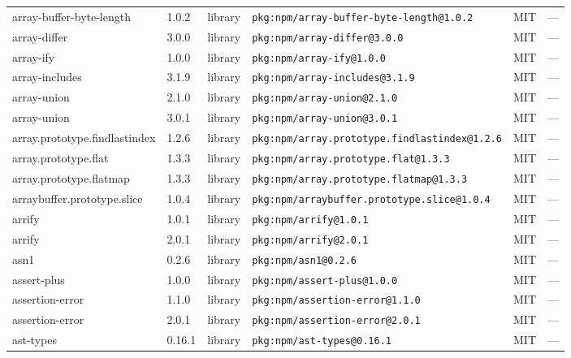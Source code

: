 \documentclass[11pt,a4paper]{article}
\begin{document}
\begin{longtable}{|p{4cm}|p{2cm}|p{1.6cm}|p{5cm}|p{1.5cm}|p{3.5cm}|}
\raggedright array-buffer-byte-length & 1.0.2 & library & \small\texttt{pkg:npm/array-buffer-byte-length@1.0.2} & MIT & \small — \\
\raggedright array-differ & 3.0.0 & library & \small\texttt{pkg:npm/array-differ@3.0.0} & MIT & \small — \\
\raggedright array-ify & 1.0.0 & library & \small\texttt{pkg:npm/array-ify@1.0.0} & MIT & \small — \\
\raggedright array-includes & 3.1.9 & library & \small\texttt{pkg:npm/array-includes@3.1.9} & MIT & \small — \\
\raggedright array-union & 2.1.0 & library & \small\texttt{pkg:npm/array-union@2.1.0} & MIT & \small — \\
\raggedright array-union & 3.0.1 & library & \small\texttt{pkg:npm/array-union@3.0.1} & MIT & \small — \\
\raggedright array.prototype.findlastindex & 1.2.6 & library & \small\texttt{pkg:npm/array.prototype.findlastindex@1.2.6} & MIT & \small — \\
\raggedright array.prototype.flat & 1.3.3 & library & \small\texttt{pkg:npm/array.prototype.flat@1.3.3} & MIT & \small — \\
\raggedright array.prototype.flatmap & 1.3.3 & library & \small\texttt{pkg:npm/array.prototype.flatmap@1.3.3} & MIT & \small — \\
\raggedright arraybuffer.prototype.slice & 1.0.4 & library & \small\texttt{pkg:npm/arraybuffer.prototype.slice@1.0.4} & MIT & \small — \\
\raggedright arrify & 1.0.1 & library & \small\texttt{pkg:npm/arrify@1.0.1} & MIT & \small — \\
\raggedright arrify & 2.0.1 & library & \small\texttt{pkg:npm/arrify@2.0.1} & MIT & \small — \\
\raggedright asn1 & 0.2.6 & library & \small\texttt{pkg:npm/asn1@0.2.6} & MIT & \small — \\
\raggedright assert-plus & 1.0.0 & library & \small\texttt{pkg:npm/assert-plus@1.0.0} & MIT & \small — \\
\raggedright assertion-error & 1.1.0 & library & \small\texttt{pkg:npm/assertion-error@1.1.0} & MIT & \small — \\
\raggedright assertion-error & 2.0.1 & library & \small\texttt{pkg:npm/assertion-error@2.0.1} & MIT & \small — \\
\raggedright ast-types & 0.16.1 & library & \small\texttt{pkg:npm/ast-types@0.16.1} & MIT & \small — \\

\end{longtable}
\end{document}
